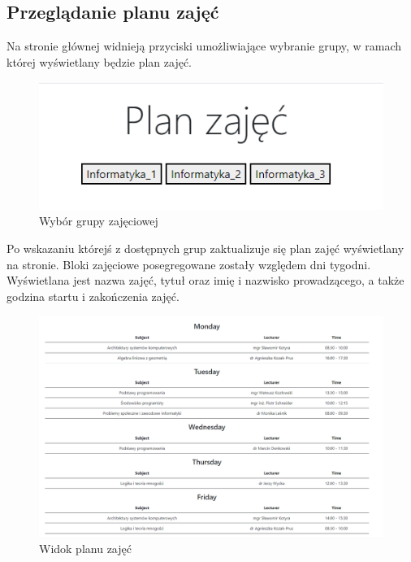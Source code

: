 \documentclass[]{article}
\begin{document}
\subsection{Przeglądanie planu zajęć}
Na stronie głównej widnieją przyciski umożliwiające wybranie grupy, w ramach której wyświetlany będzie plan zajęć.
\begin{figure}[H]
	\centering
	\includegraphics[scale=0.6]{group-selector}
	\caption{Wybór grupy zajęciowej}
\end{figure}
Po wskazaniu którejś z dostępnych grup zaktualizuje się plan zajęć wyświetlany na stronie. Bloki zajęciowe posegregowane zostały względem dni tygodni. Wyświetlana jest nazwa zajęć, tytuł oraz imię i nazwisko prowadzącego, a także godzina startu i zakończenia zajęć.
\begin{figure}[H]
	\centering
	\includegraphics[scale=0.42]{schedule-example}
	\caption{Widok planu zajęć}
\end{figure}
\end{document}
